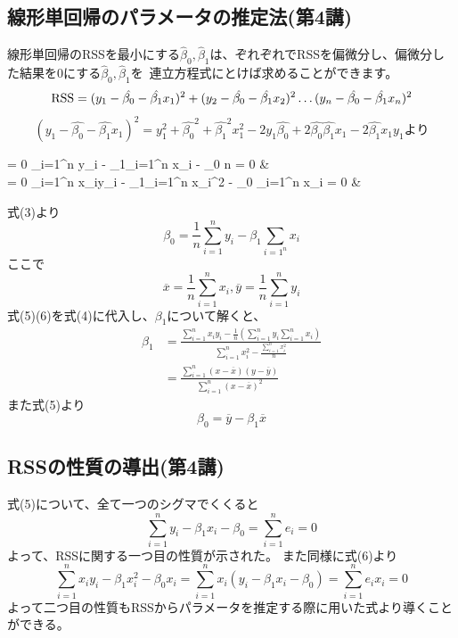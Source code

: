\documentclass[uplatex]{jsarticle}
\begin{document}
\subsection{線形単回帰のパラメータの推定法(第4講)}
線形単回帰の{\rm RSS}を最小にする$\hat{\beta}_0, \hat{\beta}_1$は、ぞれぞれで{\rm RSS}を偏微分し、偏微分した結果を0にする$\hat{\beta}_0, \hat{\beta}_1$を\
連立方程式にとけば求めることができます。
$${\rm {\rm RSS}} = (y_1 - \hat{\beta_0} - \hat{\beta_1}x_1)^2 +  (y_2 - \hat{\beta_0} - \hat{\beta_1}x_2)^2 \ldots  (y_n - \hat{\beta_0} - \hat{\beta_1}x_n)^2$$
$$(y_1 - \hat{\beta_0} - \hat{\beta_1}x_1)^2 = y_1^2 + \hat{\beta_0}^2 + \hat{\beta_1}^2x_1^2 - 2y_1\hat{\beta_0} + 2\hat{\beta_0}\hat{\beta_1}x_1 -2\hat{\beta_1}x_1y_1より$$
\begin{numcases}
  {}
   = 0 \iff \sum_{i=1}^n y_i - \beta_1\sum_{i=1}^n x_i - \beta_0 n = 0  & \\
  \frac{\partial {\rm RSS}}{\partial \hat{\beta_1}} = 0 \iff \sum_{i=1}^n x_iy_i - \beta_1\sum_{i=1}^n x_i^2 - \beta_0 \sum_{i=1}^n x_i = 0  &
\end{numcases}
式(3)より
\begin{equation}
  \beta_0 = \frac{1}{n}\sum_{i=1}^n y_i - \beta_1\sum_{i=1^n}x_i
\end{equation}
ここで
\begin{equation}
  \overline{x} = \frac{1}{n}\sum_{i=1}^n x_i, \overline{y} = \frac{1}{n}\sum_{i=1}^n y_i
\end{equation}
式(5)(6)を式(4)に代入し、$\beta_1$について解くと、
\begin{equation*}
  \begin{split}
    \beta_1 &=  \frac{\sum_{i=1}^n x_iy_i - \frac{1}{n}(\sum_{i=1}^n y_i\sum_{i=1}^n x_i)}{\sum_{i=1}^n x_i^2 - \frac{\sum_{i=1}^n x_i^2}{n}} \\
    &= \frac{\sum_{i=1}^n(x - \overline{x})(y - \overline{y})}{\sum_{i=1}^n (x - \overline{x})^2}
  \end{split}
\end{equation*}
また式(5)より
$$\beta_0 = \overline{y} - \beta_1\overline{x}$$
\subsection{{\rm RSS}の性質の導出(第4講)}
式(5)について、全て一つのシグマでくくると
\begin{equation}
  \sum_{i=1}^n y_i - \beta_1x_i - \beta_0 = \sum_{i=1}^n e_i = 0
\end{equation}
よって、{\rm RSS}に関する一つ目の性質が示された。
また同様に式(6)より
\begin{equation}
  \sum_{i=1}^n x_iy_i - \beta_1x_i^2 - \beta_0 x_i = \sum_{i=1}^n x_i (y_i - \beta_1x_i - \beta_0)  =  \sum_{i=1}^n e_ix_i = 0
\end{equation}
よって二つ目の性質も{\rm RSS}からパラメータを推定する際に用いた式より導くことができる。
\end{document}
